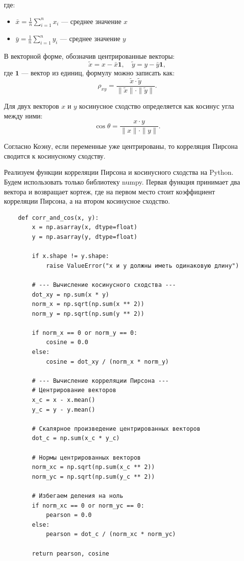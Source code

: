 \documentclass[pract]{SCWorks}
\begin{document}
    где:
    \begin{itemize}
        \item[$\bullet$] $\bar{x} = \frac{1}{n} \sum_{i=1}^{n} x_i$ — среднее значение $x$
        \item[$\bullet$] $\bar{y} = \frac{1}{n} \sum_{i=1}^{n} y_i$ — среднее значение $y$
    \end{itemize}

    В векторной форме, обозначив центрированные векторы:
    \[
    \tilde{x} = x - \bar{x}\mathbf{1}, \quad \tilde{y} = y - \bar{y}\mathbf{1},
    \]
    где $\mathbf{1}$ — вектор из единиц, формулу можно записать как:
    \[
    \rho_{xy} = \frac{\tilde{x} \cdot \tilde{y}}{\|\tilde{x}\| \cdot \|\tilde{y}\|}.
    \]

    Для двух векторов $x$ и $y$ косинусное сходство определяется как косинус угла между ними:
    \[
    \cos\theta = \frac{x \cdot y}{\|x\| \cdot \|y\|}.
    \]

    Согласно Коэну, если переменные уже центрированы, то корреляция Пирсона сводится к косинусному сходству.

    Реализуем функции корреляции Пирсона и косинусного сходства на Python. Будем использовать только библиотеку numpy.
    Первая функция принимает два вектора и возвращает кортеж, где на первом место стоит коэффициент корреляции Пирсона, а на втором косинусное сходство.

    \begin{verbatim}
    def corr_and_cos(x, y):
        x = np.asarray(x, dtype=float)
        y = np.asarray(y, dtype=float)

        if x.shape != y.shape:
            raise ValueError("x и y должны иметь одинаковую длину")

        # --- Вычисление косинусного сходства ---
        dot_xy = np.sum(x * y)
        norm_x = np.sqrt(np.sum(x ** 2))
        norm_y = np.sqrt(np.sum(y ** 2))

        if norm_x == 0 or norm_y == 0:
            cosine = 0.0
        else:
            cosine = dot_xy / (norm_x * norm_y)

        # --- Вычисление корреляции Пирсона ---
        # Центрирование векторов
        x_c = x - x.mean()
        y_c = y - y.mean()

        # Скалярное произведение центрированных векторов
        dot_c = np.sum(x_c * y_c)

        # Нормы центрированных векторов
        norm_xc = np.sqrt(np.sum(x_c ** 2))
        norm_yc = np.sqrt(np.sum(y_c ** 2))

        # Избегаем деления на ноль
        if norm_xc == 0 or norm_yc == 0:
            pearson = 0.0
        else:
            pearson = dot_c / (norm_xc * norm_yc)

        return pearson, cosine
    \end{verbatim}
\end{document}
